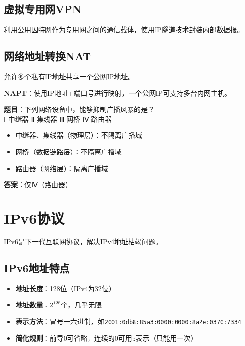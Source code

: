 \subsection{虚拟专用网VPN}
利用公用因特网作为专用网之间的通信载体，使用IP隧道技术封装内部数据报。

\subsection{网络地址转换NAT}
允许多个私有IP地址共享一个公网IP地址。

\textbf{NAPT}：使用IP地址+端口号进行映射，一个公网IP可支持多台内网主机。

\begin{examplebox}[例题4.7 网络设备与广播域]
\textbf{题目}：下列网络设备中，能够抑制广播风暴的是？\\
Ⅰ 中继器 \quad Ⅱ 集线器 \quad Ⅲ 网桥 \quad Ⅳ 路由器
\tcblower
\begin{itemize}[itemsep=0pt]
    \item 中继器、集线器（物理层）：不隔离广播域
    \item 网桥（数据链路层）：不隔离广播域
    \item 路由器（网络层）：隔离广播域
\end{itemize}
\textbf{答案}：仅Ⅳ（路由器）
\end{examplebox}

\section{IPv6协议}
IPv6是下一代互联网协议，解决IPv4地址枯竭问题。

\subsection{IPv6地址特点}
\begin{itemize}[leftmargin=2em,itemsep=0pt]
    \item \textbf{地址长度}：128位（IPv4为32位）
    \item \textbf{地址数量}：$2^{128}$个，几乎无限
    \item \textbf{表示方法}：冒号十六进制，如\texttt{2001:0db8:85a3:0000:0000:8a2e:0370:7334}
    \item \textbf{简化规则}：前导0可省略，连续的0可用::表示（只能用一次）
\end{itemize}

